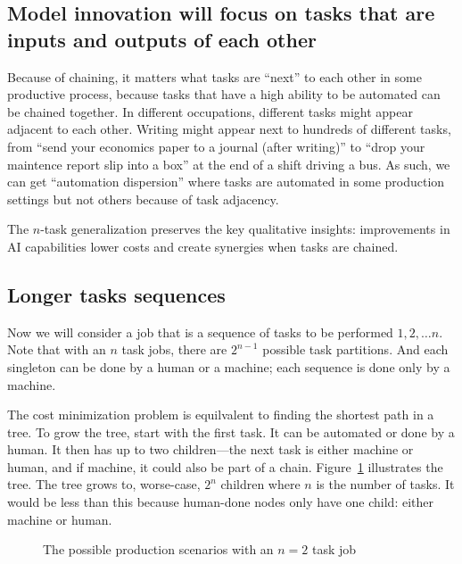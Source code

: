 \documentclass{article}
\begin{document}
\begin{tcolorbox}
  \subsection{Model innovation will focus on tasks that are inputs and outputs of each other}
  Because of chaining, it matters what tasks are ``next'' to each other in some productive process, because tasks that have a high ability to be automated can be chained together.
  In different occupations, different tasks might appear adjacent to each other. 
  Writing might appear next to hundreds of different tasks, from ``send your economics paper to a journal (after writing)'' to ``drop your maintence report slip into a box'' at the end of a shift driving a bus.
  As such, we can get ``automation dispersion'' where tasks are automated in some production settings but not others because of task adjacency.
  \end{tcolorbox}
  
The \(n\)-task generalization preserves the key qualitative insights: improvements in AI capabilities lower costs and create synergies when tasks are chained.

\subsection{Longer tasks sequences}
Now we will consider a job that is a sequence of tasks to be performed $1, 2, \ldots n$.
Note that with an $n$ task jobs, there are $2^{n-1}$ possible task partitions.
And each singleton can be done by a human or a machine; each sequence is done only by a machine.

The cost minimization problem is equilvalent to finding the shortest path in a tree.
To grow the tree, start with the first task.
It can be automated or done by a human.
It then has up to two children---the next task is either machine or human, and if machine, it could also be part of a chain.
Figure~\ref{fig:tree} illustrates the tree. 
The tree grows to, worse-case, $2^n$ children where $n$ is the number of tasks.
It would be less than this because human-done nodes only have one child: either machine or human.

\begin{figure}
\caption{The possible production scenarios with an $n=2$ task job}
\label{fig:tree}
\end{figure}
\end{document}
